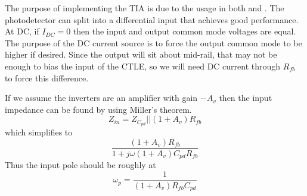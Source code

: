 The purpose of implementing the TIA is due to the usage in both \cite{mehta_12gb/s_2016} and \cite{settaluri_photonic_nodate}. The photodetector can split into a differential input that achieves good performance. At DC, if $I_{DC}=0$ then the input and output common mode voltages are equal. The purpose of the DC current source is to force the output common mode to be higher if desired. Since the output will sit about mid-rail, that may not be enough to bias the input of the CTLE, so we will need DC current through $R_{fb}$ to force this difference.

If we assume the inverters are an amplifier with gain $-A_v$ then the input impedance can be found by using Miller's theorem. 
\begin{equation}
\label{TIA input impedance}
Z_{in}=Z_{C_{pd}}||(1+A_v)R_{fb}
\end{equation}
which simplifies to 
\begin{equation}
\label{TIA input impedance}
\frac{(1+A_v)R_{fb}}{1+j\omega (1+A_v)C_{pd}R_{fb}}
\end{equation}
Thus the input pole should be roughly at
\begin{equation}
\label{TIA input pole}
\omega_p=\frac{1}{(1+A_v)R_{fb}C_{pd}}
\end{equation}

